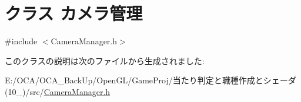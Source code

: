 \hypertarget{class_xE3_x82_xAB_xE3_x83_xA1_xE3_x83_xA9_xE7_xAE_xA1_xE7_x90_x86}{\section{クラス カメラ管理}
\label{class_xE3_x82_xAB_xE3_x83_xA1_xE3_x83_xA9_xE7_xAE_xA1_xE7_x90_x86}
}


{\ttfamily \#include $<$Camera\-Manager.\-h$>$}



このクラスの説明は次のファイルから生成されました\-:\begin{DoxyCompactItemize}
\item 
E\-:/\-O\-C\-A/\-O\-C\-A\-\_\-\-Back\-Up/\-Open\-G\-L/\-Game\-Proj/当たり判定と職種作成とシェーダ(10\-\_)/src/\hyperlink{_camera_manager_8h}{Camera\-Manager.\-h}\end{DoxyCompactItemize}
